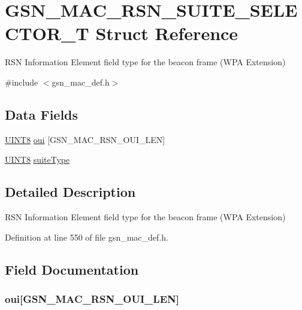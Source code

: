 \hypertarget{a00128}{
\section{GSN\_\-MAC\_\-RSN\_\-SUITE\_\-SELECTOR\_\-T Struct Reference}
\label{a00128}
}


RSN Information Element field type for the beacon frame (WPA Extension)  




{\ttfamily \#include $<$gsn\_\-mac\_\-def.h$>$}

\subsection*{Data Fields}
\begin{DoxyCompactItemize}
\item 
\hyperlink{a00660_gab27e9918b538ce9d8ca692479b375b6a}{UINT8} \hyperlink{a00128_a32b4a9d34977421ecebc18a9eef8dc2b}{oui} \mbox{[}GSN\_\-MAC\_\-RSN\_\-OUI\_\-LEN\mbox{]}
\item 
\hyperlink{a00660_gab27e9918b538ce9d8ca692479b375b6a}{UINT8} \hyperlink{a00128_a9f7d433bf6b97f3d6ea052a0c620d947}{suiteType}
\end{DoxyCompactItemize}


\subsection{Detailed Description}
RSN Information Element field type for the beacon frame (WPA Extension) 

Definition at line 550 of file gsn\_\-mac\_\-def.h.



\subsection{Field Documentation}
\hypertarget{a00128_a32b4a9d34977421ecebc18a9eef8dc2b}{
\subsubsection[{oui}]{ {\bf oui}\mbox{[}GSN\_\-MAC\_\-RSN\_\-OUI\_\-LEN\mbox{]}}}
\label{a00128_a32b4a9d34977421ecebc18a9eef8dc2b}


